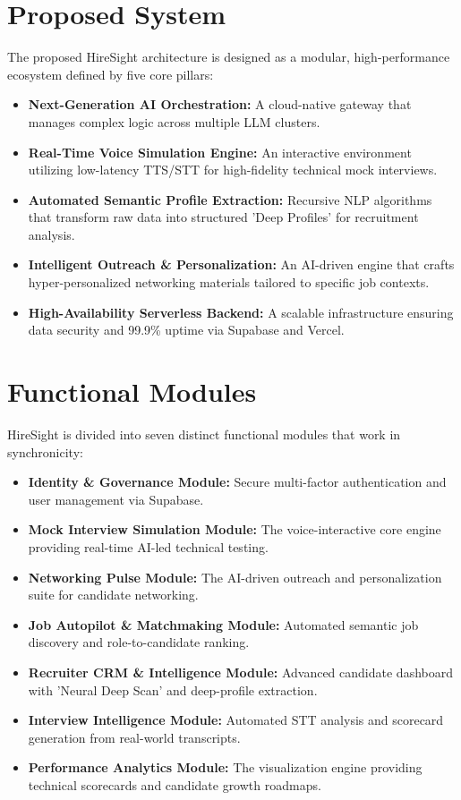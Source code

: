 \documentclass[12pt]{article}
\begin{document}
\section{Proposed System}
The proposed HireSight architecture is designed as a modular, high-performance ecosystem defined by five core pillars:
\begin{itemize}
    \item \textbf{Next-Generation AI Orchestration:} A cloud-native gateway that manages complex logic across multiple LLM clusters.
    \item \textbf{Real-Time Voice Simulation Engine:} An interactive environment utilizing low-latency TTS/STT for high-fidelity technical mock interviews.
    \item \textbf{Automated Semantic Profile Extraction:} Recursive NLP algorithms that transform raw data into structured 'Deep Profiles' for recruitment analysis.
    \item \textbf{Intelligent Outreach \& Personalization:} An AI-driven engine that crafts hyper-personalized networking materials tailored to specific job contexts.
    \item \textbf{High-Availability Serverless Backend:} A scalable infrastructure ensuring data security and 99.9\% uptime via Supabase and Vercel.
\end{itemize}

\section{Functional Modules}
HireSight is divided into seven distinct functional modules that work in synchronicity:
\begin{itemize}
    \item \textbf{Identity \& Governance Module:} Secure multi-factor authentication and user management via Supabase.
    \item \textbf{Mock Interview Simulation Module:} The voice-interactive core engine providing real-time AI-led technical testing.
    \item \textbf{Networking Pulse Module:} The AI-driven outreach and personalization suite for candidate networking.
    \item \textbf{Job Autopilot \& Matchmaking Module:} Automated semantic job discovery and role-to-candidate ranking.
    \item \textbf{Recruiter CRM \& Intelligence Module:} Advanced candidate dashboard with 'Neural Deep Scan' and deep-profile extraction.
    \item \textbf{Interview Intelligence Module:} Automated STT analysis and scorecard generation from real-world transcripts.
    \item \textbf{Performance Analytics Module:} The visualization engine providing technical scorecards and candidate growth roadmaps.
\end{itemize}
\end{document}

